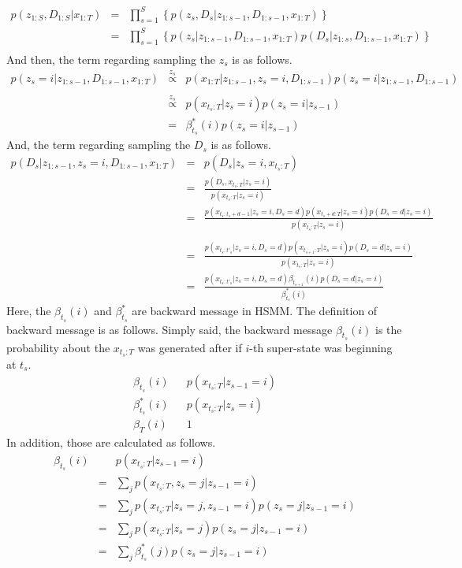 \documentclass[a4paper]{article}
\newcommand{\proptoas}[1]{\overset{#1}{\propto}}
\DeclareMathOperator{\defeq}{\ensuremath{\stackrel{\mathrm{def}}{=}}}
\begin{document}
\begin{eqnarray}
	p(z_{1:S}, D_{1:S} | x_{1:T})
	&=&
	\prod_{s=1}^{S}{\left\{ p(z_s, D_s | z_{1:s-1}, D_{1:s-1}, x_{1:T}) \right\}}\\
	&=&
	\prod_{s=1}^{S}{\left\{ p(z_s | z_{1:s-1}, D_{1:s-1}, x_{1:T}) p(D_s | z_{1:s}, D_{1:s-1}, x_{1:T})\right\}} \nonumber \\
\end{eqnarray}
And then, the term regarding sampling the $z_s$ is as follows.
\begin{eqnarray}
	p(z_s = i | z_{1:s-1}, D_{1:s-1}, x_{1:T})
	&\proptoas{z_s}&
	p(x_{1:T} | z_{1:s-1}, z_s = i, D_{1:s-1}) p(z_s = i | z_{1:s-1}, D_{1:s-1}) \nonumber \\ \\
	&\proptoas{z_s}&
	p(x_{t_s:T} | z_s = i) p(z_s = i | z_{s-1}) \\
	&=&
	\beta_{t_s}^{*}(i) p(z_s = i | z_{s-1})
\end{eqnarray}
And, the term regarding sampling the $D_s$ is as follows.
\begin{eqnarray}
	p(D_s | z_{1:s-1}, z_s = i, D_{1:s-1}, x_{1:T})
	&=&
	p(D_s | z_s = i, x_{t_s:T}) \\
	&=&
	\frac{p(D_s, x_{t_s:T} | z_s = i)}{p(x_{t_s:T} | z_s = i)}\\
	&=&
	\frac{p(x_{t_s:t_s+d-1} | z_s = i, D_s = d) p(x_{t_s+d:T} | z_s = i) p(D_s = d| z_s = i)}{p(x_{t_s:T} | z_s = i)} \nonumber \\
	\\
	&=&
	\frac{p(x_{t_s:t'_s} | z_s = i, D_s = d) p(x_{t_{s+1}:T} | z_s = i) p(D_s = d| z_s = i)}{p(x_{t_s:T} | z_s = i)} \\
	&=&
	\frac{p(x_{t_s:t'_s} | z_s = i, D_s = d) \beta_{t_{s+1}}(i) p(D_s = d| z_s = i)}{\beta_{t_s}^{*}(i)}
\end{eqnarray}
Here, the $\beta_{t_s}(i)$ and $\beta_{t_s}^{*}$ are backward message in HSMM.
The definition of backward message is as follows.
Simply said, the backward message $\beta_{t_s}(i)$ is the probability about the $x_{t_s:T}$ was generated after if $i$-th super-state was beginning at $t_s$.
\begin{eqnarray}
	\beta_{t_s}(i)
	&\defeq&
	p(x_{t_s:T} | z_{s-1} = i) \\
	\beta_{t_s}^{*}(i)
	&\defeq&
	p(x_{t_s:T} | z_s = i) \\
	\beta_{T}(i)
	&\defeq&
	1
\end{eqnarray}
In addition, those are calculated as follows.
\begin{eqnarray}
	\beta_{t_s}(i)
	&\defeq&
	p(x_{t_s:T} | z_{s-1} = i) \\
	&=&
	\sum_{j}{p(x_{t_s:T}, z_s = j | z_{s-1} = i)} \\
	&=&
	\sum_{j}{p(x_{t_s:T} | z_s = j, z_{s-1} = i) p(z_s = j | z_{s-1} = i)} \\
	&=&
	\sum_{j}{p(x_{t_s:T} | z_s = j) p(z_s = j | z_{s-1} = i)} \\
	&=&
	\sum_{j}{\beta_{t_s}^{*}(j) p(z_s = j | z_{s-1} = i)}
\end{eqnarray}
\end{document}
